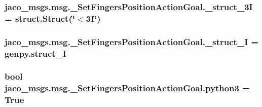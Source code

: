\subsubsection[{\texorpdfstring{\+\_\+struct\+\_\+3I}{_struct_3I}}]{\setlength{\rightskip}{0pt plus 5cm}jaco\+\_\+msgs.\+msg.\+\_\+\+Set\+Fingers\+Position\+Action\+Goal.\+\_\+struct\+\_\+3I = struct.\+Struct(\char`\"{}$<$3\+I\char`\"{})\hspace{0.3cm}{\ttfamily [private]}}\hypertarget{namespacejaco__msgs_1_1msg_1_1__SetFingersPositionActionGoal_a3eee8c8626f970a2e16712a6bbaa56c5}{}\label{namespacejaco__msgs_1_1msg_1_1__SetFingersPositionActionGoal_a3eee8c8626f970a2e16712a6bbaa56c5}
\subsubsection[{\texorpdfstring{\+\_\+struct\+\_\+I}{_struct_I}}]{\setlength{\rightskip}{0pt plus 5cm}jaco\+\_\+msgs.\+msg.\+\_\+\+Set\+Fingers\+Position\+Action\+Goal.\+\_\+struct\+\_\+I = genpy.\+struct\+\_\+I\hspace{0.3cm}{\ttfamily [private]}}\hypertarget{namespacejaco__msgs_1_1msg_1_1__SetFingersPositionActionGoal_a775d9cc5e9af6817bffeabf2a2cfba5c}{}\label{namespacejaco__msgs_1_1msg_1_1__SetFingersPositionActionGoal_a775d9cc5e9af6817bffeabf2a2cfba5c}
\subsubsection[{\texorpdfstring{python3}{python3}}]{\setlength{\rightskip}{0pt plus 5cm}bool jaco\+\_\+msgs.\+msg.\+\_\+\+Set\+Fingers\+Position\+Action\+Goal.\+python3 = True}\hypertarget{namespacejaco__msgs_1_1msg_1_1__SetFingersPositionActionGoal_abaedf9bc415e7e7b7f17c36b99b4a33b}{}\label{namespacejaco__msgs_1_1msg_1_1__SetFingersPositionActionGoal_abaedf9bc415e7e7b7f17c36b99b4a33b}
